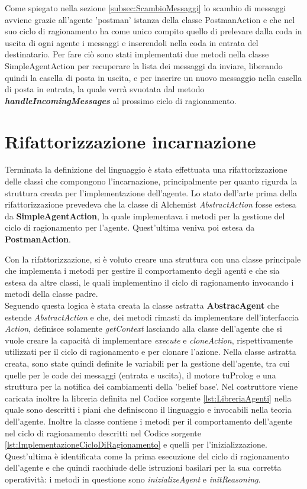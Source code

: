 \documentclass[12pt,a4paper,openright,twoside]{report}
\begin{document}
\bigskip

Come spiegato nella sezione \ref{subsec:ScambioMessaggi} lo scambio di messaggi avviene grazie all'agente 'postman' istanza della classe PostmanAction e che nel suo ciclo di ragionamento ha come unico compito quello di prelevare dalla coda in uscita di ogni agente i messaggi e inserendoli nella coda in entrata del destinatario. Per fare ci\`o sono stati implementati due metodi nella classe SimpleAgentAction per recuperare la lista dei messaggi da inviare, liberando quindi la casella di posta in uscita, e per inserire un nuovo messaggio nella casella di posta in entrata, la quale verr\`a svuotata dal metodo \textbf{\textit{handleIncomingMessages}} al prossimo ciclo di ragionamento.


\section{Rifattorizzazione incarnazione}
Terminata la definizione del linguaggio \`e stata effettuata una rifattorizzazione delle classi che compongono l'incarnazione, principalmente per quanto rigurda la struttura creata per l'implementazione dell'agente.
Lo stato dell'arte prima della rifattorizzazione prevedeva che la classe di Alchemist \textit{AbstractAction} fosse estesa da \textbf{SimpleAgentAction}, la quale implementava i metodi per la gestione del ciclo di ragionamento per l'agente. Quest'ultima veniva poi estesa da \textbf{PostmanAction}.

Con la rifattorizzazione, si \`e voluto creare una struttura con una classe principale che implementa i metodi per gestire il comportamento degli agenti e che sia estesa da altre classi, le quali implementino il ciclo di ragionamento invocando i metodi della classe padre.
\\
Seguendo questa logica \`e stata creata la classe astratta \textbf{AbstracAgent} che estende \textit{AbstractAction} e che, dei metodi rimasti da implementare dell'interfaccia \textit{Action}, definisce solamente \textit{getContext} lasciando alla classe dell'agente che si vuole creare la capacit\`a di implementare \textit{execute} e \textit{cloneAction}, rispettivamente utilizzati per il ciclo di ragionamento e per clonare l'azione.
Nella classe astratta creata, sono state quindi definite le variabili per la gestione dell'agente, tra cui quelle per le code dei messaggi (entrata e uscita), il motore tuProlog e una struttura per la notifica dei cambiamenti della 'belief base'. Nel costruttore viene caricata inoltre la libreria definita nel Codice sorgente \ref{lst:LibreriaAgenti} nella quale sono descritti i piani che definiscono il linguaggio e invocabili nella teoria dell'agente. Inoltre la classe contiene i metodi per il comportamento dell'agente nel ciclo di ragionamento descritti nel Codice sorgente \ref{lst:ImplementazioneCicloDiRagionamento} e quelli per l'inizializzazione. Quest'ultima \`e identificata come la prima esecuzione del ciclo di ragionamento dell'agente e che quindi racchiude delle istruzioni basilari per la sua corretta operativit\`a: i metodi in questione sono \textit{inizializeAgent} e \textit{initReasoning}.
\end{document}

